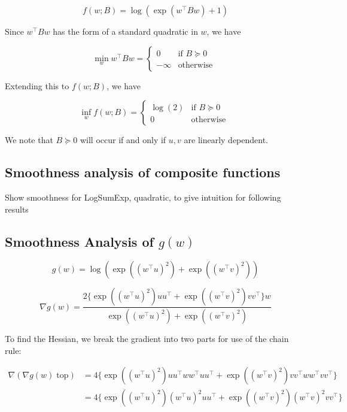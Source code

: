\documentclass[11pt]{article}
\begin{document}
\begin{equation}
    f(w; B) = \log(\exp(w^{\top}Bw) + 1)
\end{equation}

Since $w^{\top}Bw$ has the form of a standard quadratic in $w$, we have

\begin{equation}
    \min_{w} w^{\top}Bw = \begin{cases} 
    0 &\mbox{if } B \succeq 0 \\
    -\infty & \mbox{otherwise } \end{cases}
\end{equation}

Extending this to $f(w; B)$, we have

\begin{equation}
    \inf_{w} f(w; B) = \begin{cases} 
    \log(2) &\mbox{if } B \succeq 0 \\
    0 & \mbox{otherwise } \end{cases}
\end{equation}

We note that $B \succeq 0$ will occur if and only if $u, v$ are linearly dependent.

\subsection{Smoothness analysis of composite functions}

Show smoothness for LogSumExp, quadratic, to give intuition for following results

\subsection{Smoothness Analysis of $g(w)$}

\begin{equation}
    g(w) = \log( \exp((w^{\top}u)^2) + \exp((w^{\top}v)^2) )
\end{equation}

\begin{equation}
    \nabla g(w) 
    = \frac{ 2 \{ \exp((w^{\top}u)^2)uu^{\top} + \exp((w^{\top}v)^2)vv^{\top}  \} w}{ \exp((w^{\top}u)^2) + \exp((w^{\top}v)^2) }
\end{equation}

To find the Hessian, we break the gradient into two parts for use of the chain rule:

\begin{align*}
    \nabla (\nabla g(w) \; \textrm{top}) 
    &= 4 \{ \exp((w^{\top}u)^2)uu^{\top}ww^{\top}uu^{\top} + \exp((w^{\top}v)^2)vv^{\top}ww^{\top}vv^{\top} \} \\
    &= 4 \{ \exp((w^{\top}u)^2)(w^{\top}u)^2 uu^{\top} + \exp((w^{\top}v)^2)(w^{\top}v)^2 vv^{\top} \}
\end{align*}
\end{document}
